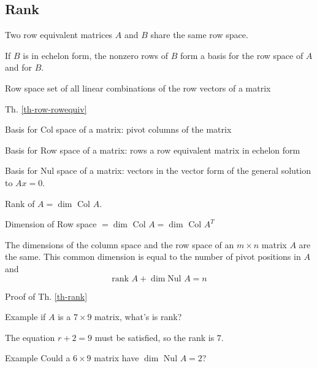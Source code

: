\begin{card}
    \subsection{Rank}

    \begin{theorem}\label{th-row-rowequiv}
    Two row equivalent matrices $A$ and $B$ share the same row space.

    If $B$ is in echelon form, the nonzero rows of $B$ form a basis for the
    row space of $A$ and for $B$.
    \end{theorem}

    \begin{compactdesc}
    \item[Row space] set of all linear combinations of the row vectors of a
        matrix
    \item[Th. \ref{th-row-rowequiv}]
    \item[Basis for Col] space of a matrix: pivot columns of the matrix
    \item[Basis for Row] space of a matrix: rows a row equivalent matrix
        in echelon form
    \item[Basis for Nul] space of a matrix: vectors in the vector form of
        the general solution to $Ax = 0$.
    \item[Rank] of $A = \dim$ Col $A$.
    \item[Dimension of Row] space $= \dim$ Col $A = \dim$ Col $A^T$
    \end{compactdesc}
    \begin{theorem}\label{th-rank}
    The dimensions of the column space and the row space of an $m \times n$
    matrix $A$ are the same. This common dimension is equal to the
    number of pivot positions in $A$ and
    $$ \text{rank } A + \dim \text{Nul } A = n$$
    \end{theorem}
    \begin{compactdesc}
    \item[Proof of Th. \ref{th-rank}]
    \item[Example] if $A$ is a $7 \times 9$ matrix, what's is rank?

        The equation $r + 2 = 9$ must be satisfied, so the rank is $7$.
    \item[Example] Could a $6\times9$ matrix have $\dim$ Nul $A = 2$?


\end{compactdesc}
\end{card}
